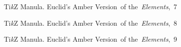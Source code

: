 \documentclass[a4paper,11pt]{article}
\begin{document}
\begin{figure}[ht]

  \centering

  \begin{tikzpicture}














  \end{tikzpicture}

  \caption{Ti\textit{k}Z Manula. Euclid's Amber Version~of
    the~\textit{Elements},~7}

\end{figure}





\begin{figure}[ht]

  \centering

  \begin{tikzpicture}









  \end{tikzpicture}

  \caption{Ti\textit{k}Z Manula. Euclid's Amber Version~of
    the~\textit{Elements},~8}

\end{figure}





\begin{figure}[ht]

  \centering

  \begin{tikzpicture}
























  \end{tikzpicture}

  \caption{Ti\textit{k}Z Manula. Euclid's Amber Version~of
    the~\textit{Elements},~9}

\end{figure}
\end{document}
